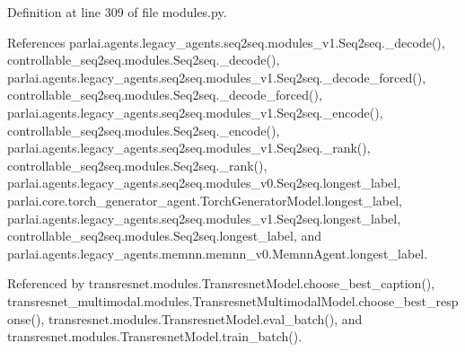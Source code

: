 Definition at line 309 of file modules.\+py.



References parlai.\+agents.\+legacy\+\_\+agents.\+seq2seq.\+modules\+\_\+v1.\+Seq2seq.\+\_\+decode(), controllable\+\_\+seq2seq.\+modules.\+Seq2seq.\+\_\+decode(), parlai.\+agents.\+legacy\+\_\+agents.\+seq2seq.\+modules\+\_\+v1.\+Seq2seq.\+\_\+decode\+\_\+forced(), controllable\+\_\+seq2seq.\+modules.\+Seq2seq.\+\_\+decode\+\_\+forced(), parlai.\+agents.\+legacy\+\_\+agents.\+seq2seq.\+modules\+\_\+v1.\+Seq2seq.\+\_\+encode(), controllable\+\_\+seq2seq.\+modules.\+Seq2seq.\+\_\+encode(), parlai.\+agents.\+legacy\+\_\+agents.\+seq2seq.\+modules\+\_\+v1.\+Seq2seq.\+\_\+rank(), controllable\+\_\+seq2seq.\+modules.\+Seq2seq.\+\_\+rank(), parlai.\+agents.\+legacy\+\_\+agents.\+seq2seq.\+modules\+\_\+v0.\+Seq2seq.\+longest\+\_\+label, parlai.\+core.\+torch\+\_\+generator\+\_\+agent.\+Torch\+Generator\+Model.\+longest\+\_\+label, parlai.\+agents.\+legacy\+\_\+agents.\+seq2seq.\+modules\+\_\+v1.\+Seq2seq.\+longest\+\_\+label, controllable\+\_\+seq2seq.\+modules.\+Seq2seq.\+longest\+\_\+label, and parlai.\+agents.\+legacy\+\_\+agents.\+memnn.\+memnn\+\_\+v0.\+Memnn\+Agent.\+longest\+\_\+label.



Referenced by transresnet.\+modules.\+Transresnet\+Model.\+choose\+\_\+best\+\_\+caption(), transresnet\+\_\+multimodal.\+modules.\+Transresnet\+Multimodal\+Model.\+choose\+\_\+best\+\_\+response(), transresnet.\+modules.\+Transresnet\+Model.\+eval\+\_\+batch(), and transresnet.\+modules.\+Transresnet\+Model.\+train\+\_\+batch().

